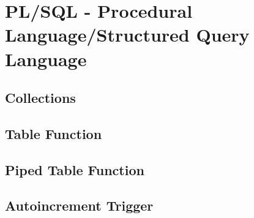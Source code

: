 \section[PLSQL]{PL/SQL - Procedural Language/Structured Query Language}
\label{sec:plsql}

\subsection{Collections}
\label{sec:olap.collections}

\subsection{Table Function}
\label{sec:olap.table_function}

\subsection{Piped Table Function}
\label{sec:olap.piped_table_function}

\subsection{Autoincrement Trigger}
\label{sec:olap.autoincrement_trigger}

